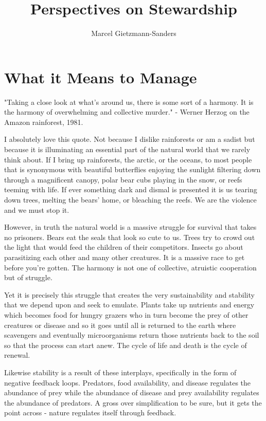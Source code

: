 \documentclass[11pt,a5paper]{book}
\title{Perspectives on Stewardship}
\author{Marcel Gietzmann-Sanders}
\date{}
\begin{document}
\maketitle
\tableofcontents
\newpage

\chapter{What it Means to Manage}

"Taking a close look at what's around us, there is some sort of a harmony. It is the harmony of overwhelming and collective murder." - Werner Herzog on the Amazon rainforest, 1981. \newline

I absolutely love this quote. Not because I dislike rainforests or am a sadist but because it is illuminating an essential part of the natural world that we rarely think about. If I bring up rainforests, the arctic, or the oceans, to most people that is synonymous with beautiful butterflies enjoying the sunlight filtering down through a magnificent canopy, polar bear cubs playing in the snow, or reefs teeming with life. If ever something dark and dismal is presented it is us tearing down trees, melting the bears' home, or bleaching the reefs. We are the violence and we must stop it. 

However, in truth the natural world is a massive struggle for survival that takes no prisoners. Bears eat the seals that look so cute to us. Trees try to crowd out the light that would feed the children of their competitors. Insects go about parasitizing each other and many other creatures. It is a massive race to get before you're gotten. The harmony is not one of collective, atruistic cooperation but of struggle. 

Yet it is precisely this struggle that creates the very sustainability and stability that we depend upon and seek to emulate. Plants take up nutrients and energy which becomes food for hungry grazers who in turn become the prey of other creatures or disease and so it goes until all is returned to the earth where scavengers and eventually microorganisms return those nutrients back to the soil so that the process can start anew. The cycle of life and death is the cycle of renewal. 

Likewise stability is a result of these interplays, specifically in the form of negative feedback loops. Predators, food availability, and disease regulates the abundance of prey while the abundance of disease and prey availability regulates the abundance of predators. A gross over simplification to be sure, but it gets the point across - nature regulates itself through feedback. \newline
\end{document}
